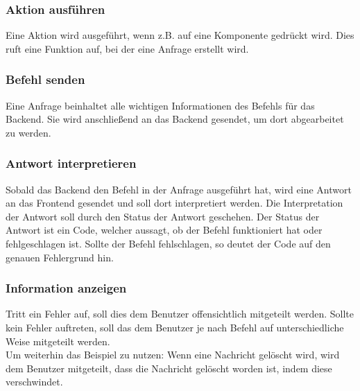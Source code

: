 \subsubsection{Aktion ausführen}
Eine Aktion wird ausgeführt, wenn z.B. auf eine Komponente gedrückt wird. Dies ruft eine Funktion auf, bei der eine Anfrage erstellt wird.

\subsubsection{Befehl senden}
Eine Anfrage beinhaltet alle wichtigen Informationen des Befehls für das Backend. Sie wird anschließend an das Backend gesendet, um dort abgearbeitet zu werden.

\subsubsection{Antwort interpretieren}
Sobald das Backend den Befehl in der Anfrage ausgeführt hat, wird eine Antwort an das Frontend gesendet und soll dort interpretiert werden. Die Interpretation der Antwort soll durch den Status der Antwort geschehen. Der Status der Antwort ist ein Code, welcher aussagt, ob der Befehl funktioniert hat oder fehlgeschlagen ist. Sollte der Befehl fehlschlagen, so deutet der Code auf den genauen Fehlergrund hin.

\subsubsection{Information anzeigen}
Tritt ein Fehler auf, soll dies dem Benutzer offensichtlich mitgeteilt werden. Sollte kein Fehler auftreten, soll das dem Benutzer je nach Befehl auf unterschiedliche Weise mitgeteilt werden.\\
Um weiterhin das Beispiel zu nutzen: Wenn eine Nachricht gelöscht wird, wird dem Benutzer mitgeteilt, dass die Nachricht gelöscht worden ist, indem diese verschwindet.